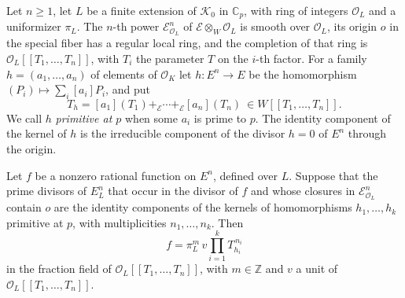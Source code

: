 Let $n\ge1$, let $L$ be a finite extension of $\mathcal K_0$ in $\mathbb C_p$, with ring of integers $\mathcal O_L$ and a uniformizer $\pi_L$. The $n$-th power $\mathcal E^n_{\mathcal O_L}$ of $\mathcal E\otimes_W\mathcal O_L$ is smooth over $\mathcal O_L$, its origin $o$ in the special fiber has a regular local ring, and the completion of that ring is $\mathcal O_L[[T_1,\dots,T_n]]$, with $T_i$ the parameter $T$ on the $i$-th factor. For a family $h=(a_1,\dots,a_n)$ of elements of $\mathcal O_K$ let $h\colon E^n\to E$ be the homomorphism $(P_i)\mapsto\sum_i[a_i]P_i$, and put
\[
T_h=[a_1](T_1)+_{\mathcal E}\cdots+_{\mathcal E}[a_n](T_n)\ \in W[[T_1,\dots,T_n]].
\]
We call $h$ \emph{primitive at $p$} when some $a_i$ is prime to $p$. The identity component of the kernel of $h$ is the irreducible component of the divisor $h=0$ of $E^n$ through the origin.

\begin{lemma}\label{divunit}
Let $f$ be a nonzero rational function on $E^n$, defined over $L$. Suppose that the prime divisors of $E^n_L$ that occur in the divisor of $f$ and whose closures in $\mathcal E^n_{\mathcal O_L}$ contain $o$ are the identity components of the kernels of homomorphisms $h_1,\dots,h_k$ primitive at $p$, with multiplicities $n_1,\dots,n_k$. Then
\[
f=\pi_L^m\,v\prod_{i=1}^kT_{h_i}^{\,n_i}
\]
in the fraction field of $\mathcal O_L[[T_1,\dots,T_n]]$, with $m\in\mathbb Z$ and $v$ a unit of $\mathcal O_L[[T_1,\dots,T_n]]$.
\end{lemma}

